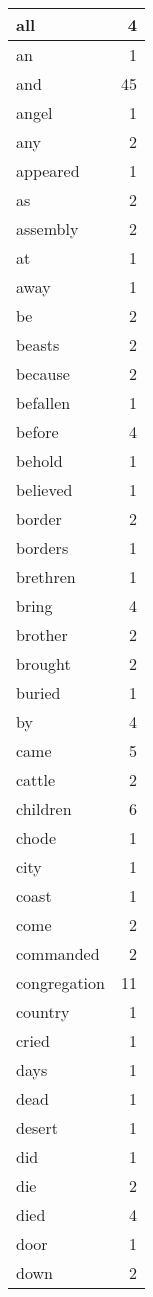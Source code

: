 \begin{center}
\begin{longtable}{l|r}
all & 4 \\ \hline
an & 1 \\ \hline
and & 45 \\ \hline
angel & 1 \\ \hline
any & 2 \\ \hline
appeared & 1 \\ \hline
as & 2 \\ \hline
assembly & 2 \\ \hline
at & 1 \\ \hline
away & 1 \\ \hline
be & 2 \\ \hline
beasts & 2 \\ \hline
because & 2 \\ \hline
befallen & 1 \\ \hline
before & 4 \\ \hline
behold & 1 \\ \hline
believed & 1 \\ \hline
border & 2 \\ \hline
borders & 1 \\ \hline
brethren & 1 \\ \hline
bring & 4 \\ \hline
brother & 2 \\ \hline
brought & 2 \\ \hline
buried & 1 \\ \hline
by & 4 \\ \hline
came & 5 \\ \hline
cattle & 2 \\ \hline
children & 6 \\ \hline
chode & 1 \\ \hline
city & 1 \\ \hline
coast & 1 \\ \hline
come & 2 \\ \hline
commanded & 2 \\ \hline
congregation & 11 \\ \hline
country & 1 \\ \hline
cried & 1 \\ \hline
days & 1 \\ \hline
dead & 1 \\ \hline
desert & 1 \\ \hline
did & 1 \\ \hline
die & 2 \\ \hline
died & 4 \\ \hline
door & 1 \\ \hline
down & 2 \\ \hline

\end{longtable}
\end{center}
